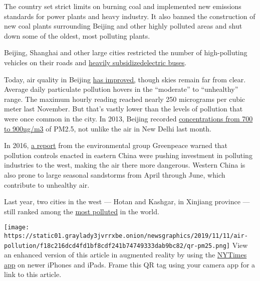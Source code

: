 The country set strict limits on burning coal and implemented new
emissions standards for power plants and heavy industry. It also banned
the construction of new coal plants surrounding Beijing and other highly
polluted areas and shut down some of the oldest, most polluting plants.

Beijing, Shanghai and other large cities restricted the number of
high-polluting vehicles on their roads and
\href{https://www.scmp.com/business/china-business/article/2169709/shenzhens-all-electric-bus-fleet-worlds-first-comes-massive}{heavily
subsidized}\href{https://www.scmp.com/business/china-business/article/2169709/shenzhens-all-electric-bus-fleet-worlds-first-comes-massive}{electric
buses}.

Today, air quality in Beijing
\href{https://www.nytimes3xbfgragh.onion/2018/03/12/upshot/china-pollution-environment-longer-lives.html}{has
improved,} though skies remain far from clear. Average daily particulate
pollution hovers in the ``moderate'' to ``unhealthy'' range. The maximum
hourly reading reached nearly 250 micrograms per cubic meter last
November. But that's vastly lower than the levels of pollution that were
once common in the city. In 2013, Beijing recorded
\href{https://jech.bmj.com/content/69/3/201}{concentrations from 700 to
900}\href{https://jech.bmj.com/content/69/3/201}{µg/m3} of PM2.5, not
unlike the air in New Delhi last month.

In 2016,
\href{http://www.greenpeace.org/eastasia/news/blog/china-air-pollution-heading-west/blog/56213/}{a
report} from the environmental group Greenpeace warned that pollution
controls enacted in eastern China were pushing investment in polluting
industries to the west, making the air there more dangerous. Western
China is also prone to large seasonal sandstorms from April through
June, which contribute to unhealthy air.

Last year, two cities in the west --- Hotan and Kashgar, in Xinjiang
province --- still ranked among the
\href{https://www.airvisual.com/world-most-polluted-cities}{most
polluted} in the world.

\texttt{[image: https://static01.graylady3jvrrxbe.onion/newsgraphics/2019/11/11/air-pollution/f18c216dcd4fd1bf8cdf241b74749333dab9bc82/qr-pm25.png]}
View an enhanced version of this article in augmented reality by using
the
\href{http://www.nytimes3xbfgragh.onion/services/mobile/index.html}{NYTimes
app} on newer iPhones and iPads. Frame this QR tag using your camera app
for a link to this article.

